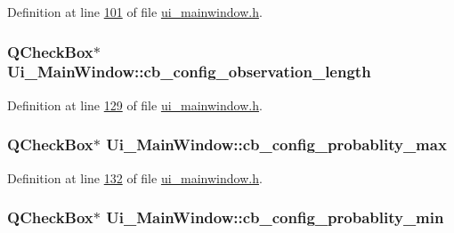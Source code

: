 Definition at line \hyperlink{a00139_source_l00101}{101} of file \hyperlink{a00139_source}{ui\+\_\+mainwindow.\+h}.

\hypertarget{a00080_ae9e8f3f0d147a4cd21c8f36ffb3bd81f}{
\subsubsection[{cb\+\_\+config\+\_\+observation\+\_\+length}]{\setlength{\rightskip}{0pt plus 5cm}Q\+Check\+Box$\ast$ Ui\+\_\+\+Main\+Window\+::cb\+\_\+config\+\_\+observation\+\_\+length}}\label{a00080_ae9e8f3f0d147a4cd21c8f36ffb3bd81f}


Definition at line \hyperlink{a00139_source_l00129}{129} of file \hyperlink{a00139_source}{ui\+\_\+mainwindow.\+h}.

\hypertarget{a00080_ad0a7ea02564c112595f0d30efa75eef2}{
\subsubsection[{cb\+\_\+config\+\_\+probablity\+\_\+max}]{\setlength{\rightskip}{0pt plus 5cm}Q\+Check\+Box$\ast$ Ui\+\_\+\+Main\+Window\+::cb\+\_\+config\+\_\+probablity\+\_\+max}}\label{a00080_ad0a7ea02564c112595f0d30efa75eef2}


Definition at line \hyperlink{a00139_source_l00132}{132} of file \hyperlink{a00139_source}{ui\+\_\+mainwindow.\+h}.

\hypertarget{a00080_a6e32cc42adcf308df94cbbc9ac226f50}{
\subsubsection[{cb\+\_\+config\+\_\+probablity\+\_\+min}]{\setlength{\rightskip}{0pt plus 5cm}Q\+Check\+Box$\ast$ Ui\+\_\+\+Main\+Window\+::cb\+\_\+config\+\_\+probablity\+\_\+min}}\label{a00080_a6e32cc42adcf308df94cbbc9ac226f50}


